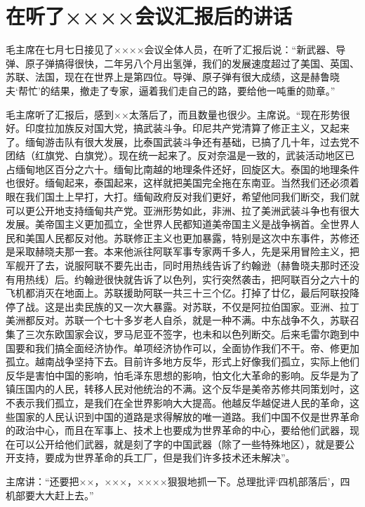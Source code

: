 \section[在听了××××会议汇报后的讲话（一九六七年七月七日）]{在听了××××会议汇报后的讲话}


毛主席在七月七日接见了××××会议全体人员，在听了汇报后说：“新武器、导弹、原子弹搞得很快，二年另八个月出氢弹，我们的发展速度超过了美国、英国、苏联、法国，现在在世界上是第四位。导弹、原子弹有很大成绩，这是赫鲁晓夫‘帮忙’的结果，撤走了专家，逼着我们走自己的路，要给他一吨重的勋章。”

毛主席听了汇报后，感到××太落后了，而且数量也很少。主席说。“现在形势很好。印度拉加族反对国大党，搞武装斗争。印尼共产党清算了修正主义，又起来了。缅甸游击队有很大发展，比泰国武装斗争还有基础，已搞了几十年，过去党不团结（红旗党、白旗党）。现在统一起来了。反对奈温是一致的，武装活动地区已占缅甸地区百分之六十。缅甸比南越的地理条件还好，回旋区大。泰国的地理条件也很好。缅甸起来，泰国起来，这样就把美国完全拖在东南亚。当然我们还必须着眼在我们国土上早打，大打。缅甸政府反对我们更好，希望他同我们断交，我们就可以更公开地支持缅甸共产党。亚洲形势如此，非洲、拉了美洲武装斗争也有很大发展。美帝国主义更加孤立，全世界人民都知道美帝国主义是战争祸首。全世界人民和美国人民都反对他。苏联修正主义也更加暴露，特别是这次中东事件，苏修还是采取赫晓夫那一套。本来他派往阿联军事专家两千多人，先是采用冒险主义，把军舰开了去，说服阿联不要先出击，同时用热线告诉了约翰逊（赫鲁晓夫那时还没有用热线）后。约翰逊很快就告诉了以色列，实行突然袭击，把阿联百分之六十的飞机都消灭在地面上。苏联援助阿联一共三十三个亿。打掉了廿亿，最后阿联投降停了战。这是出卖民族的又一次大暴露。对苏联，不仅是阿拉伯国家。亚洲、拉丁美洲都反对。苏联一个七十多岁老人自杀，就是一种不满。中东战争不久，苏联召集了三次东欧国家会议，罗马尼亚不签字，也未和以色列断交。后来毛雷尔跑到中国要和我们搞全面经济协作。单项经济协作可以，全面协作我们不干。帝、修更加孤立。越南战争坚持下去。目前许多地方反华，形式上好像我们孤立，实际上他们反华是害怕中国的影响，怕毛泽东思想的影响，怕文化大革命的影响。反华是为了镇压国内的人民，转移人民对他统治的不满。这个反华是美帝苏修共同策划吋，这不表示我们孤立，是我们在全世界影响大大提高。他越反华越促进人民的革命，这些国家的人民认识到中国的道路是求得解放的唯一道路。我们中国不仅是世界革命的政治中心，而且在军事上、技术上也要成为世界革命的中心，要给他们武器，现在可以公开给他们武器，就是刻了字的中国武器（除了一些特殊地区），就是要公开支持，要成为世界革命的兵工厂，但是我们许多技术还未解决”。

主席讲：“还要把××，×××，××××狠狠地抓一下。总理批评‘四机部落后’，四机部要大大赶上去。”


